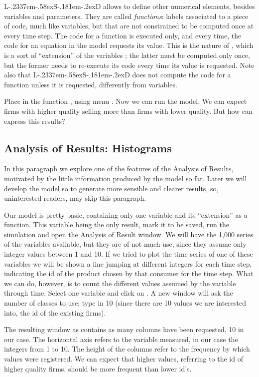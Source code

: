 \documentclass [11pt,a4paper] {book}
\def\LsD{{L\kern-.2337em\lower-.58ex\hbox{S}\kern-.181em\lower-.2ex\hbox{D}}\xspace}
\begin{document}
\LsD allows to define other numerical elements, besides variables and parameters. They are called \textit{functions}: labels associated to a piece of code, much like variables, but that are not constrained to be computed once at every time step. The code for a function is executed only, and every time, the code for an equation in the model requests its value. This is the nature of , which is a sort of ``extension'' of the variables ; the latter must be computed only once, but the former needs to re-execute its code every time its value is requested. Note also that \LsD does not compute the code for a function unless it is requested, differently from variables. 

Place in  the function , using menu . Now we can run the model. We can expect firms with higher quality selling more than firms with lower quality. But how can express this results?

\subsection{Analysis of Results: Histograms}

In this paragraph we explore one of the features of the Analysis of Results, motivated by the little information produced by the model so far. Later we will develop the model so to generate more sensible and clearer results, so, uninterested readers, may skip this paragraph.

Our model is pretty basic, containing only one variable and its ``extension'' as a function. This variable being the only result, mark it to be saved, run the simulation and open the Analysis of Result window. We will have the 1,000 series of the  variables available, but they are of not much use, since they assume only integer values between 1 and 10. If we tried to plot the time series of one of these variables we will be shown a line jumping at different integers for each time step, indicating the id of the product chosen by that consumer for the time step. What we can do, however, is to count the different values assumed by the variable through time. Select one variable and click on . A new window will ask the number of classes to use; type in 10 (since there are 10 values we are interested into, the id of the existing firms). 

The resulting window as contains as many columns have been requested, 10 in our case. The horizontal axis refers to the variable measured, in our case the integers from 1 to 10. The height of the columns refer to the frequency by which values were registered. We can expect that higher values, referring to the id of higher quality firms, should be more frequent than lower id's. 
\end{document}
